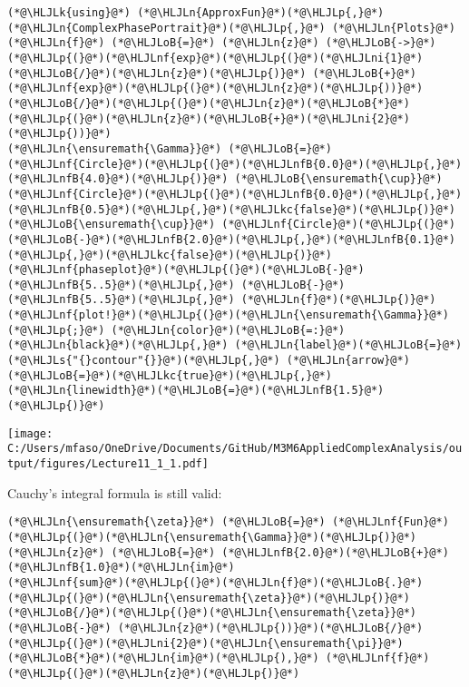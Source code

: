 \documentclass[12pt,a4paper]{article}
\newcommand{\HLJLk}[1]{\textcolor[RGB]{148,91,176}{\textbf{#1}}}
\newcommand{\HLJLkc}[1]{\textcolor[RGB]{59,151,46}{\textit{#1}}}
\newcommand{\HLJLn}[1]{#1}
\newcommand{\HLJLnf}[1]{\textcolor[RGB]{66,102,213}{#1}}
\newcommand{\HLJLs}[1]{\textcolor[RGB]{201,61,57}{#1}}
\newcommand{\HLJLnfB}[1]{\textcolor[RGB]{59,151,46}{#1}}
\newcommand{\HLJLni}[1]{\textcolor[RGB]{59,151,46}{#1}}
\newcommand{\HLJLoB}[1]{\textcolor[RGB]{102,102,102}{\textbf{#1}}}
\newcommand{\HLJLp}[1]{#1}
\begin{document}
\begin{lstlisting}
(*@\HLJLk{using}@*) (*@\HLJLn{ApproxFun}@*)(*@\HLJLp{,}@*) (*@\HLJLn{ComplexPhasePortrait}@*)(*@\HLJLp{,}@*) (*@\HLJLn{Plots}@*)
(*@\HLJLn{f}@*) (*@\HLJLoB{=}@*) (*@\HLJLn{z}@*) (*@\HLJLoB{->}@*) (*@\HLJLp{(}@*)(*@\HLJLnf{exp}@*)(*@\HLJLp{(}@*)(*@\HLJLni{1}@*)(*@\HLJLoB{/}@*)(*@\HLJLn{z}@*)(*@\HLJLp{)}@*) (*@\HLJLoB{+}@*) (*@\HLJLnf{exp}@*)(*@\HLJLp{(}@*)(*@\HLJLn{z}@*)(*@\HLJLp{))}@*)(*@\HLJLoB{/}@*)(*@\HLJLp{(}@*)(*@\HLJLn{z}@*)(*@\HLJLoB{*}@*)(*@\HLJLp{(}@*)(*@\HLJLn{z}@*)(*@\HLJLoB{+}@*)(*@\HLJLni{2}@*)(*@\HLJLp{))}@*)
(*@\HLJLn{\ensuremath{\Gamma}}@*) (*@\HLJLoB{=}@*) (*@\HLJLnf{Circle}@*)(*@\HLJLp{(}@*)(*@\HLJLnfB{0.0}@*)(*@\HLJLp{,}@*) (*@\HLJLnfB{4.0}@*)(*@\HLJLp{)}@*) (*@\HLJLoB{\ensuremath{\cup}}@*) (*@\HLJLnf{Circle}@*)(*@\HLJLp{(}@*)(*@\HLJLnfB{0.0}@*)(*@\HLJLp{,}@*)(*@\HLJLnfB{0.5}@*)(*@\HLJLp{,}@*)(*@\HLJLkc{false}@*)(*@\HLJLp{)}@*) (*@\HLJLoB{\ensuremath{\cup}}@*) (*@\HLJLnf{Circle}@*)(*@\HLJLp{(}@*)(*@\HLJLoB{-}@*)(*@\HLJLnfB{2.0}@*)(*@\HLJLp{,}@*)(*@\HLJLnfB{0.1}@*)(*@\HLJLp{,}@*)(*@\HLJLkc{false}@*)(*@\HLJLp{)}@*)
(*@\HLJLnf{phaseplot}@*)(*@\HLJLp{(}@*)(*@\HLJLoB{-}@*)(*@\HLJLnfB{5..5}@*)(*@\HLJLp{,}@*) (*@\HLJLoB{-}@*)(*@\HLJLnfB{5..5}@*)(*@\HLJLp{,}@*) (*@\HLJLn{f}@*)(*@\HLJLp{)}@*)
(*@\HLJLnf{plot!}@*)(*@\HLJLp{(}@*)(*@\HLJLn{\ensuremath{\Gamma}}@*)(*@\HLJLp{;}@*) (*@\HLJLn{color}@*)(*@\HLJLoB{=:}@*)(*@\HLJLn{black}@*)(*@\HLJLp{,}@*) (*@\HLJLn{label}@*)(*@\HLJLoB{=}@*)(*@\HLJLs{"{}contour"{}}@*)(*@\HLJLp{,}@*) (*@\HLJLn{arrow}@*)(*@\HLJLoB{=}@*)(*@\HLJLkc{true}@*)(*@\HLJLp{,}@*) (*@\HLJLn{linewidth}@*)(*@\HLJLoB{=}@*)(*@\HLJLnfB{1.5}@*)(*@\HLJLp{)}@*)
\end{lstlisting}

\texttt{[image: C:/Users/mfaso/OneDrive/Documents/GitHub/M3M6AppliedComplexAnalysis/output/figures/Lecture11\_1\_1.pdf]}

Cauchy's integral formula is still valid:


\begin{lstlisting}
(*@\HLJLn{\ensuremath{\zeta}}@*) (*@\HLJLoB{=}@*) (*@\HLJLnf{Fun}@*)(*@\HLJLp{(}@*)(*@\HLJLn{\ensuremath{\Gamma}}@*)(*@\HLJLp{)}@*)
(*@\HLJLn{z}@*) (*@\HLJLoB{=}@*) (*@\HLJLnfB{2.0}@*)(*@\HLJLoB{+}@*)(*@\HLJLnfB{1.0}@*)(*@\HLJLn{im}@*)
(*@\HLJLnf{sum}@*)(*@\HLJLp{(}@*)(*@\HLJLn{f}@*)(*@\HLJLoB{.}@*)(*@\HLJLp{(}@*)(*@\HLJLn{\ensuremath{\zeta}}@*)(*@\HLJLp{)}@*)(*@\HLJLoB{/}@*)(*@\HLJLp{(}@*)(*@\HLJLn{\ensuremath{\zeta}}@*) (*@\HLJLoB{-}@*) (*@\HLJLn{z}@*)(*@\HLJLp{))}@*)(*@\HLJLoB{/}@*)(*@\HLJLp{(}@*)(*@\HLJLni{2}@*)(*@\HLJLn{\ensuremath{\pi}}@*)(*@\HLJLoB{*}@*)(*@\HLJLn{im}@*)(*@\HLJLp{),}@*) (*@\HLJLnf{f}@*)(*@\HLJLp{(}@*)(*@\HLJLn{z}@*)(*@\HLJLp{)}@*)
\end{lstlisting}
\end{document}
